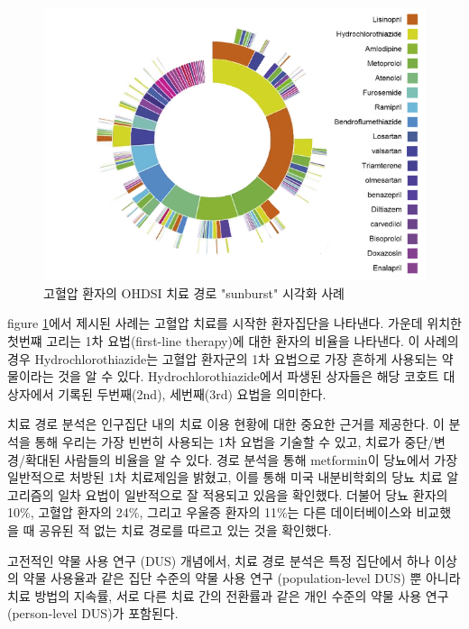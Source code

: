 \documentclass[11pt]{book}
\theoremstyle{definition}
\theoremstyle{definition}
\theoremstyle{definition}
\theoremstyle{remark}
\begin{document}
\begin{figure}

{\centering \includegraphics[width=1\linewidth]{images/Characterization/pnasTreatmentPathwaysSunburst} 

}

\caption{고혈압 환자의 OHDSI 치료 경로 "sunburst" 시각화 사례}\label{fig:treatmentPathwaysSunburstDataViz}
\end{figure}

figure \ref{fig:treatmentPathwaysSunburstDataViz}에서 제시된 사례는
고혈압 치료를 시작한 환자집단을 나타낸다. 가운데 위치한 첫번쨰 고리는
1차 요법(first-line therapy)에 대한 환자의 비율을 나타낸다. 이 사례의
경우 Hydrochlorothiazide는 고혈압 환자군의 1차 요법으로 가장 흔하게
사용되는 약물이라는 것을 알 수 있다. Hydrochlorothiazide에서 파생된
상자들은 해당 코호트 대상자에서 기록된 두번째(2nd), 세번째(3rd) 요법을
의미한다.

치료 경로 분석은 인구집단 내의 치료 이용 현황에 대한 중요한 근거를
제공한다. 이 분석을 통해 우리는 가장 빈번히 사용되는 1차 요법을 기술할
수 있고, 치료가 중단/변경/확대된 사람들의 비율을 알 수 있다. 경로 분석을
통해 metformin이 당뇨에서 가장 일반적으로 처방된 1차 치료제임을 밝혔고,
이를 통해 미국 내분비학회의 당뇨 치료 알고리즘의 일차 요법이 일반적으로
잘 적용되고 있음을 확인했다. 더불어 당뇨 환자의 10\%, 고혈압 환자의
24\%, 그리고 우울증 환자의 11\%는 다른 데이터베이스와 비교했을 때 공유된
적 없는 치료 경로를 따르고 있는 것을 확인했다.

고전적인 약물 사용 연구 (DUS) 개념에서, 치료 경로 분석은 특정 집단에서
하나 이상의 약물 사용율과 같은 집단 수준의 약물 사용 연구
(population-level DUS) 뿐 아니라 치료 방법의 지속률, 서로 다른 치료 간의
전환률과 같은 개인 수준의 약물 사용 연구 (person-level DUS)가 포함된다.
\end{document}
